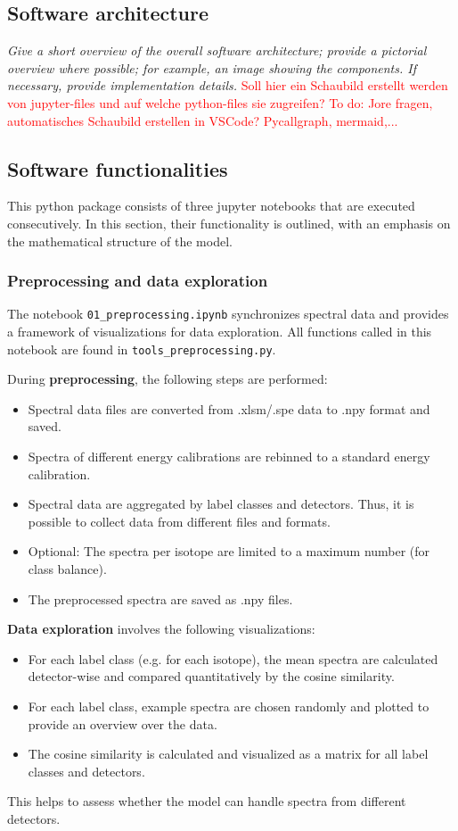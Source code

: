 \documentclass[preprint,12pt, a4paper]{elsarticle}
\begin{document}
\subsection{Software architecture}
\textit{  Give a short overview of the overall software architecture; provide a pictorial overview where possible; for example, an image showing the components. If necessary, provide implementation details.}
\textcolor{red}{Soll hier ein Schaubild erstellt werden von jupyter-files und auf welche python-files sie zugreifen? To do: Jore fragen, automatisches Schaubild erstellen in VSCode? Pycallgraph, mermaid,...}

 \subsection{Software functionalities}

This python package consists of three jupyter notebooks that are executed consecutively. In this section, their functionality is outlined, with an emphasis on the mathematical structure of the model. 

\subsubsection{Preprocessing and data exploration}  
The notebook \texttt{01\_preprocessing.ipynb} synchronizes spectral data and provides a framework of visualizations for data exploration. All functions called in this notebook are found in \texttt{tools\_preprocessing.py}. 

During \textbf{preprocessing}, the following steps are performed:   
\begin{itemize}
\item Spectral data files are converted from .xlsm/.spe data to .npy format and saved.  
\item Spectra of different energy calibrations are rebinned to a standard energy calibration.  
\item Spectral data are aggregated by label classes and detectors. Thus, it is possible to 
  collect data from different files and formats.  
\item Optional: The spectra per isotope are limited to a maximum number (for class balance).  
\item The preprocessed spectra are saved as .npy files.  
\end{itemize}


\textbf{Data exploration} involves the following visualizations: 
\begin{itemize}
\item For each label class (e.g. for each isotope), the mean spectra are calculated detector-wise and compared 
  quantitatively by the cosine similarity.  
\item For each label class, example spectra are chosen randomly and plotted to provide an overview
  over the data.  
\item The cosine similarity is calculated and visualized as a matrix for all label classes and detectors. 
\end{itemize}
This helps to assess whether the model can handle spectra from different detectors.   
\end{document}
